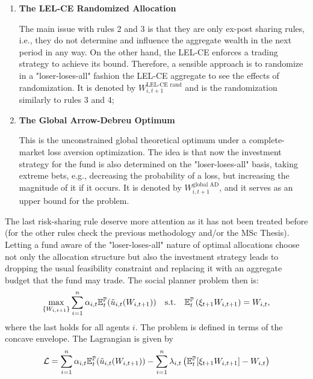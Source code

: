 \begin{enumerate}
    This follows exactly the framework described in Section 4.6 of the thesis, that combines the ideas of \citet{NgNguyen2025} and \citet{Dong2020}, with the allocation denoted by $W_{i,t+1}^{\text{LEL-CE}}$. We take the bound $\epsilon = 0.005 \times W_{t}$;

    \item \textbf{The LEL-CE Randomized Allocation}
    
    The main issue with rules 2 and 3 is that they are only ex-post sharing rules, i.e., they do not determine and influence the aggregate wealth in the next period in any way. On the other hand, the LEL-CE enforces a trading strategy to achieve its bound. Therefore, a sensible approach is to randomize in a "loser-loses-all" fashion the LEL-CE aggregate to see the effects of randomization. It is denoted by $W_{i,t+1}^{\text{LEL-CE rand}}$ and is the randomization similarly to rules 3 and 4;

    \item \textbf{The Global Arrow-Debreu Optimum}
    
    This is the unconstrained global theoretical optimum under a complete-market loss aversion optimization. The idea is that now the investment strategy for the fund is also determined on the "loser-loses-all" basis, taking extreme bets, e.g., decreasing the probability of a loss, but increasing the magnitude of it if it occurs. It is denoted by $W_{i,t+1}^{\text{global AD}}$, and it serves as an upper bound for the problem.
\end{enumerate}
The last risk-sharing rule deserve more attention as it has not been treated before (for the other rules check the previous methodology and/or the MSc Thesis). Letting a fund aware of the "loser-loses-all" nature of optimal allocations choose not only the allocation structure but also the investment strategy leads to dropping the usual feasibility constraint and replacing it with an aggregate budget that the fund may trade. The social planner problem then is:
\begin{equation*}
    \max_{\{W_{i,t+1}\}} \sum_{i=1}^n \alpha_{i,t} \mathbb{E}_t^{\mathbb{P}}(\tilde{u}_{i,t}(W_{i,t+1})) \quad \text{s.t.} \quad \mathbb{E}_t^{\mathbb{P}}\left(\xi_{t+1} W_{i,t+1} \right) = W_{i,t},
\end{equation*}
where the last holds for all agents $i$. The problem is defined in terms of the concave envelope. The Lagrangian is given by
\begin{equation*}
    \mathcal{L} = \sum_{i=1}^n \alpha_{i,t} \mathbb{E}_t^{\mathbb{P}}(\tilde{u}_{i,t}(W_{i,t+1})) - \sum_{i=1}^n \lambda_{i,t} \left( \mathbb{E}_t^{\mathbb{P}}[\xi_{t+1} W_{i,t+1}] - W_{i,t} \right)
\end{equation*}
